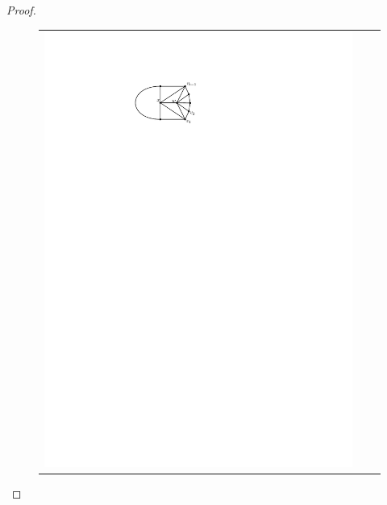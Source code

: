 \documentclass[12pt]{article}
\theoremstyle{definition}
\begin{document}
\begin{proof}
\begin{figure}[htbp]
\begin{tabular}{ccc}
      \includegraphics[page=2]{figs/killing_a_leaf} &

\end{tabular}
\end{figure}
\end{proof}
\end{document}

